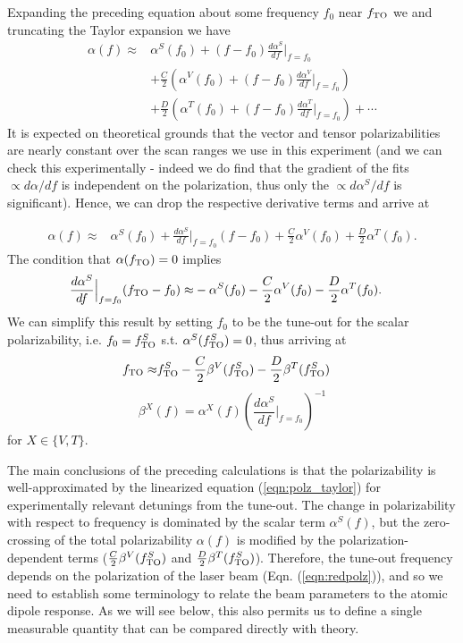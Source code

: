 	Expanding the preceding equation about some frequency $f_0$ near $f_\mathrm{TO}$ we and truncating the Taylor expansion we have
	\begin{align}
		 \alpha(f)  \approx & \alpha^S(f_0) + (f-f_0)\frac{d\alpha^S}{df}\Bigr|_{f=f_0} \\
		 &+ \frac{C}{2}\left(\alpha^V(f_0) + (f-f_0)\frac{d\alpha^V}{df}\Bigr|_{f=f_0} \right)\\
		 & +\frac{D}{2}\left(\alpha^T(f_0) + (f-f_0)\frac{d\alpha^T}{df}\Bigr|_{f=f_0} \right) + \cdots
	\end{align}
	It is expected on theoretical grounds that the vector and tensor polarizabilities are nearly constant over the scan ranges we use in this experiment (and we can check this experimentally - indeed we do find that the gradient of the fits $\propto d\alpha /d f$ is independent on the polarization, thus only the $\propto d\alpha^S /d f$ is significant).	Hence, we can drop the respective derivative terms and arrive at

	\begin{align}
		 \alpha(f)  \approx & \alpha^S(f_0) + \frac{d\alpha^S}{df}\Bigr|_{f=f_0} (f-f_0) + \frac{C}{2}\alpha^V(f_0) + \frac{D}{2}\alpha^T(f_0).
		 \label{eqn:polz_taylor}
	\end{align}
	The condition that $\alpha(f_\mathrm{TO})=0$ implies
	\begin{align}
		 \frac{d\alpha^S}{df}\Bigr|_{f=f_0} (f_\mathrm{TO}-f_0) \approx & -\alpha^S(f_0) - \frac{C}{2}\alpha^V(f_0) - \frac{D}{2}\alpha^T(f_0).
	\end{align}
	We can simplify this result by setting $f_0$ to be the tune-out for the scalar polarizability, i.e. $f_0=f_\mathrm{TO}^S$ s.t. $\alpha^S(f_\mathrm{TO}^S)=0$, thus arriving at
	\begin{align}
		 f_\mathrm{TO} \approx & f_\mathrm{TO}^S - \frac{C}{2}\beta^V(f_\mathrm{TO}^S) - \frac{D}{2}\beta^T(f_\mathrm{TO}^S)
		 \label{eqn:redpolz}
	\end{align}
	\begin{equation}
		\beta^X(f) = \alpha^X(f)\left(\frac{d\alpha^S}{df}\Bigr|_{f=f_0}\right)^{-1}
	\end{equation}
	for $X\in\{V,T\}$.

	The main conclusions of the preceding calculations is that the polarizability is well-approximated by the linearized equation (\ref{eqn:polz_taylor}) for experimentally relevant detunings from the tune-out. The change in polarizability with respect to frequency is dominated by the scalar term $\alpha^S(f)$, but the zero-crossing of the total polarizability $\alpha(f)$ is modified by the polarization-dependent terms ($\frac{C}{2}\beta^V(f_\mathrm{TO}^S)$ and $\frac{D}{2}\beta^T(f_\mathrm{TO}^S)$). Therefore, the tune-out frequency depends on the polarization of the laser beam (Eqn. (\ref{eqn:redpolz})), and so we need to establish some terminology to relate the beam parameters to the atomic dipole response. As we will see below, this also permits us to define a single measurable quantity that can be compared directly with theory.

